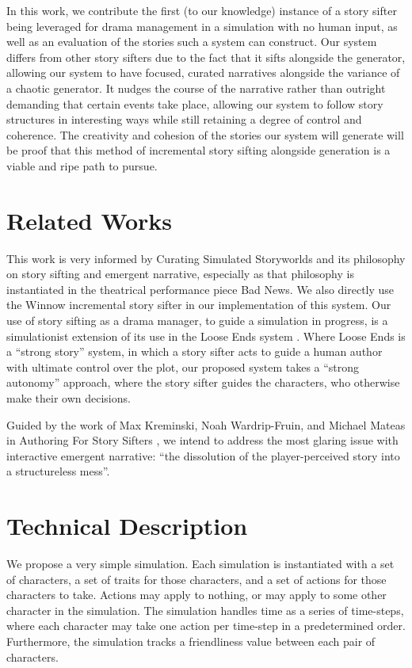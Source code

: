 \documentclass[letterpaper]{article}
\begin{document}
In this work, we contribute the first (to our knowledge) instance of a story sifter being
leveraged for drama management in a simulation with no human input, as well as an
evaluation of the stories such a system can construct. Our system differs from other story
sifters due to the fact that it sifts alongside the generator, allowing our system to have
focused, curated narratives alongside the variance of a chaotic generator. It nudges the
course of the narrative rather than outright demanding that certain events take place,
allowing our system to follow story structures in interesting ways while still retaining a
degree of control and coherence. The creativity and cohesion of the stories our system
will generate will be proof that this method of incremental story sifting alongside
generation is a viable and ripe path to pursue.

\section{Related Works}
This work is very informed by Curating Simulated Storyworlds \cite{ryan:curating} and its
philosophy on story sifting and emergent narrative, especially as that philosophy is
instantiated in the theatrical performance piece Bad News. We also directly use the Winnow
incremental story sifter \cite{kreminski:winnow} in our implementation of this system. Our
use of story sifting as a drama manager, to guide a simulation in progress, is a
simulationist extension of its use in the Loose Ends system \cite{kreminski:loose}. Where
Loose Ends is a “strong story” system, in which a story sifter acts to guide a human
author with ultimate control over the plot, our proposed system takes a “strong autonomy”
approach, where the story sifter guides the characters, who otherwise make their own
decisions. 

Guided by the work of Max Kreminski, Noah Wardrip-Fruin, and Michael Mateas in Authoring
For Story Sifters \cite{kreminski:authoring}, we intend to address the most glaring issue
with interactive emergent narrative: “the dissolution of the player-perceived story into a
structureless mess”.

\section{Technical Description}
We propose a very simple simulation. Each simulation is instantiated with a set of
characters, a set of traits for those characters, and a set of actions for those
characters to take. Actions may apply to nothing, or may apply to some other character in
the simulation. The simulation handles time as a series of time-steps, where each
character may take one action per time-step in a predetermined order. Furthermore, the
simulation tracks a friendliness value between each pair of characters.  
\end{document}
